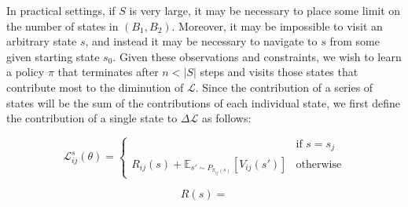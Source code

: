 \documentclass{article}
\begin{document}
In practical settings, if $S$ is very large, it may be necessary to place some limit on the number of states in $(B_1, B_2)$. Moreover, it may be impossible to visit an arbitrary state $s$, and instead it may be necessary to navigate to $s$ from some given starting state $s_0$. Given these observations and constraints, we wish to learn a policy $\pi$ that terminates after $n < |S|$ steps and visits those states that contribute most to the diminution of $\mathcal{L}$. Since the contribution of a series of states will be the sum of the contributions of each individual state, we first define the contribution of a single state to $\Delta \mathcal{L}$ as follows:

\[
	\mathcal{L}_{ij}^s(\theta) = 
  \begin{cases}
     & \text{if } s = s_j \\ 
    R_{ij}(s) + \mathbb{E}_{s' \sim P_{\pi_{ij}(s)}}\left [ V_{ij}(s') \right ] & \text{otherwise}
  \end{cases}
\]

\[
	R(s) = 
\]
\end{document}
